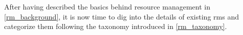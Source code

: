 After having described the basics behind resource management in \autoref{rm_background}, it is now time to dig into the details of existing \glspl{rm} and categorize them following the taxonomy introduced in \autoref{rm_taxonomy}.